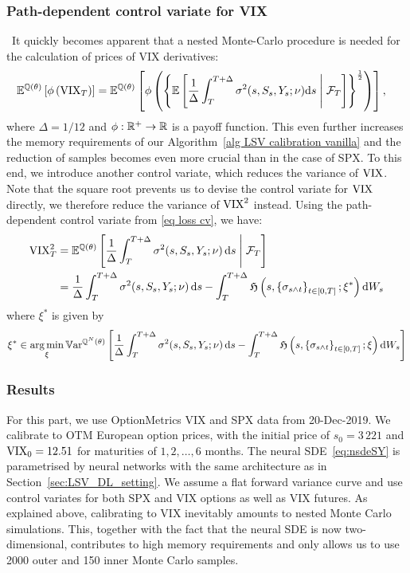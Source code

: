 \subsubsection{Path-dependent control variate for VIX}\
It quickly becomes apparent that a nested Monte-Carlo procedure is needed for the calculation of prices of VIX derivatives:
\begin{align*}
\mathbb{E}^{\mathbb{Q}(\theta)}\left[\phi\left(\mathrm{VIX}_T \right) \right] &= \mathbb{E}^{\mathbb{Q}(\theta)}\left[\phi \left( \left\{ \mathbb{E}\left[ \frac{1}{\Delta} \int_T^{T+\Delta} \sigma^2(s, S_s, Y_s; \nu) \mathrm{d} s \;\middle\vert\; \mathcal{F}_T \right] \right\}^\frac{1}{2}\right)\right],
\end{align*}
where $\Delta=1/12$ and $\phi: \mathbb{R}^+ \to \mathbb{R}$ is a payoff function. This even further increases the memory requirements of our Algorithm~\ref{alg LSV calibration vanilla} and the reduction of samples becomes even more crucial than in the case of SPX. To this end, we introduce another control variate, which reduces the variance of $\mathrm{VIX}$. Note that the square root prevents us to devise the control variate for $\mathrm{VIX}$ directly, we therefore reduce the variance of $\mathrm{VIX}^2$ instead. Using the path-dependent control variate from \eqref{eq loss cv}, we have:
\begin{align*}
\mathrm{VIX}^2_T &= \mathbb{E}^{\mathbb{Q}(\theta)}\left[ \frac{1}{\Delta} \int_T^{T+\Delta} \sigma^2(s, S_s, Y_s; \nu) \, \mathrm{d} s \;\middle\vert\; \mathcal{F}_T\right] \\
&= \frac{1}{\Delta} \int_{T}^{T+\Delta} \sigma^{2}(s, S_s, Y_s; \nu) \, \mathrm{d} s -\int_T^{T+\Delta} \mathfrak{H} \left(s, \left\{\sigma_{s \wedge t}\right\}_{t \in[0, T]} ; \xi^*\right) \mathrm{d} W_{s}
\end{align*}
where $\xi^*$ is given by
\[
\xi^* \in \operatorname*{arg\,min}_\xi \mathbb{V}\mathrm{ar}^{\mathbb{Q}^N(\theta)}\left[\frac{1}{\Delta} \int_{T}^{T+\Delta} \sigma^{2}(s, S_s, Y_s; \nu) \, \mathrm{d} s - \int_T^{T+\Delta} \mathfrak{H}\left(s, \left\{\sigma_{s\wedge t}\right\}_{t\in[0,T]}; \xi\right) \mathrm{d} W_{s} \right]
\]
\subsubsection{Results}
For this part, we use OptionMetrics VIX and SPX data from 20-Dec-2019. We calibrate to OTM European option prices, with the initial price of $s_0=3\,221$ and $\mathrm{VIX}_0=12.51$ for maturities of $1,2,\ldots,6$ months. The neural SDE~\eqref{eq:nsdeSY} is parametrised by neural networks with the same architecture as in Section~\ref{sec:LSV_DL_setting}. We assume a flat forward variance curve and use control variates for both SPX and VIX options as well as VIX futures. As explained above, calibrating to VIX inevitably amounts to nested Monte Carlo simulations. This, together with the fact that the neural SDE is now two-dimensional, contributes to high memory requirements and only allows us to use 2000 outer and 150 inner Monte Carlo samples.

